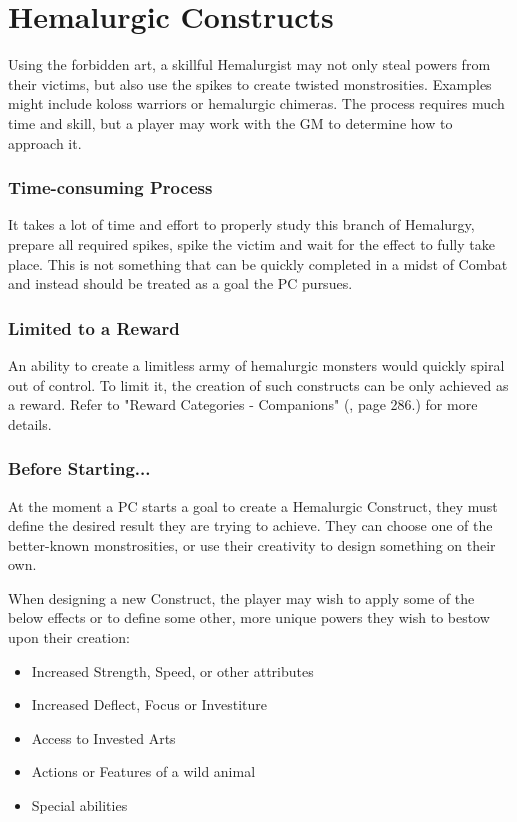 \section{Hemalurgic Constructs}
\label{sec:hemalurgyConstructs}

Using the forbidden art, a skillful Hemalurgist may not only steal powers from their victims, but also use the spikes to create twisted monstrosities. Examples might include koloss warriors or hemalurgic chimeras. The process requires much time and skill, but a player may work with the GM to determine how to approach it.

\subsubsection{Time-consuming Process}

It takes a lot of time and effort to properly study this branch of Hemalurgy, prepare all required spikes, spike the victim and wait for the effect to fully take place. This is not something that can be quickly completed in a midst of Combat and instead should be treated as a goal the PC pursues.

\subsubsection{Limited to a Reward}

An ability to create a limitless army of hemalurgic monsters would quickly spiral out of control. To limit it, the creation of such constructs can be only achieved as a  reward. Refer to "Reward Categories - Companions" (\handbookMistborn{}, page 286.) for more details.

\subsubsection{Before Starting...}

At the moment a PC starts a goal to create a Hemalurgic Construct, they must define the desired result they are trying to achieve. They can choose one of the better-known monstrosities, or use their creativity to design something on their own.

When designing a new Construct, the player may wish to apply some of the below effects or to define some other, more unique powers they wish to bestow upon their creation:

\begin{itemize}
	\item Increased Strength, Speed, or other attributes
	\item Increased Deflect, Focus or Investiture
	\item Access to Invested Arts
	\item Actions or Features of a wild animal
	\item Special abilities
\end{itemize}

